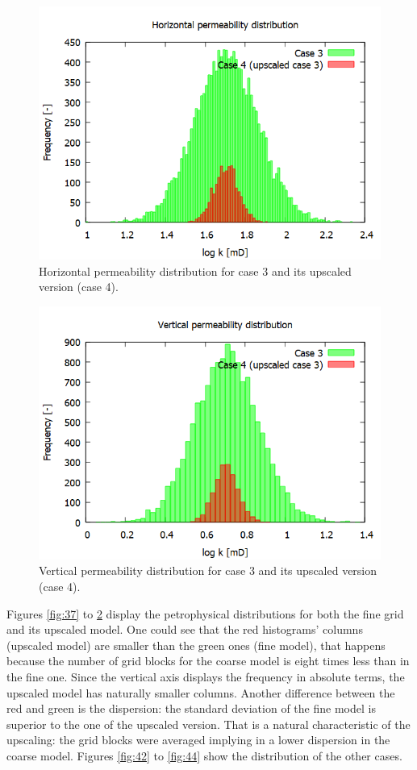 \begin{figure}[H]
	\centering
	\includegraphics[width=0.8\linewidth]{Images/38}
	\caption{Horizontal permeability distribution for case 3 and its upscaled version (case 4).}
	\label{fig:38}
\end{figure}

\begin{figure}[H]
	\centering
	\includegraphics[width=0.8\linewidth]{Images/39}
	\caption{Vertical permeability distribution for case 3 and its upscaled version (case 4).}
	\label{fig:39}
\end{figure}

Figures \ref{fig:37} to \ref{fig:39} display the petrophysical distributions for both the fine grid and its upscaled model. One could see that the red histograms' columns (upscaled model) are smaller than the green ones (fine model), that happens because the number of grid blocks for the coarse model is eight times less than in the fine one. Since the vertical axis displays the frequency in absolute terms, the upscaled model has naturally smaller columns. Another difference between the red and green is the dispersion: the standard deviation of the fine model is superior to the one of the upscaled version. That is a natural characteristic of the upscaling: the grid blocks were averaged implying in a lower dispersion in the coarse model. Figures \ref{fig:42} to \ref{fig:44} show the distribution of the other cases.

